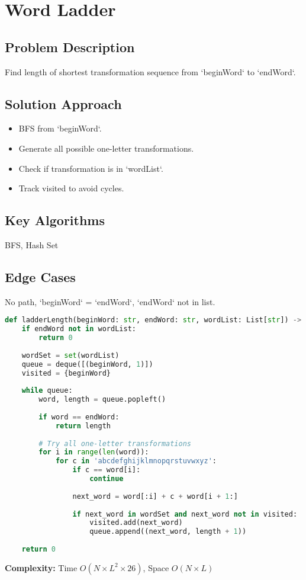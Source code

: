 \documentclass[10pt, a4paper]{article}
\begin{document}
\section{Word Ladder}
\subsection*{Problem Description}
Find length of shortest transformation sequence from `beginWord` to `endWord`.

\subsection*{Solution Approach}
\begin{itemize}
    \item BFS from `beginWord`.
    \item Generate all possible one-letter transformations.
    \item Check if transformation is in `wordList`.
    \item Track visited to avoid cycles.
\end{itemize}

\subsection*{Key Algorithms}
BFS, Hash Set

\subsection*{Edge Cases}
No path, `beginWord` = `endWord`, `endWord` not in list.

\begin{lstlisting}[language=Python]
def ladderLength(beginWord: str, endWord: str, wordList: List[str]) -> int:
    if endWord not in wordList:
        return 0
    
    wordSet = set(wordList)
    queue = deque([(beginWord, 1)])
    visited = {beginWord}
    
    while queue:
        word, length = queue.popleft()
        
        if word == endWord:
            return length
        
        # Try all one-letter transformations
        for i in range(len(word)):
            for c in 'abcdefghijklmnopqrstuvwxyz':
                if c == word[i]:
                    continue
                    
                next_word = word[:i] + c + word[i + 1:]
                
                if next_word in wordSet and next_word not in visited:
                    visited.add(next_word)
                    queue.append((next_word, length + 1))
    
    return 0
\end{lstlisting}
\textbf{Complexity:} Time $O(N \times L^2 \times 26)$, Space $O(N \times L)$
\end{document}
